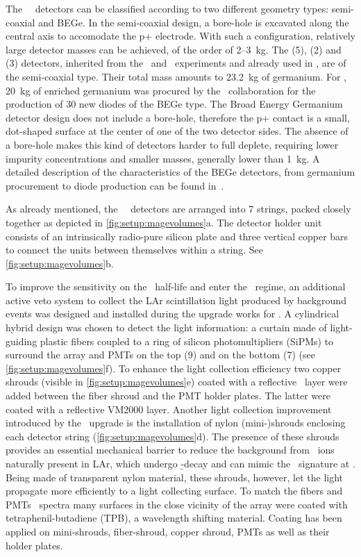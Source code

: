 The \gerda\ \phasetwo\ detectors can be classified according to two different geometry
types: semi-coaxial and BEGe. In the semi-coaxial design, a bore-hole is excavated along
the central axis to accomodate the p+ electrode. With such a configuration, relatively
large detector masses can be achieved, of the order of 2--3~kg. The \ANG{} (5), \RG{} (2)
and \GTF{} (3) detectors, inherited from the \hdm\ and \igex\ experiments and already used
in \phaseone, are of the semi-coaxial type. Their total mass amounts to 23.2~kg of
germanium.  For \phasetwo, 20~kg of enriched germanium was procured by the \gerda\
collaboration for the production of 30 new diodes of the BEGe type. The Broad Energy
Germanium detector design does not include a bore-hole, therefore the p+ contact is a
small, dot-shaped surface at the center of one of the two detector sides. The absence of a
bore-hole makes this kind of detectors harder to full deplete, requiring lower impurity
concentrations and smaller masses, generally lower than 1~kg. A detailed description of
the characteristics of the BEGe detectors, from germanium procurement to diode production
can be found in~\cite{Agostini2015e, Agostini2018a, Agostini2019}.

As already mentioned, the \gerda\ \phasetwo\ detectors are arranged into 7 strings, packed
closely together as depicted in \cref{fig:setup:magevolumes}a. The detector holder unit
consists of an intrinsically radio-pure silicon plate and three vertical copper bars to
connect the units between themselves within a string. See \cref{fig:setup:magevolumes}b.

To improve the sensitivity on the \onbb\ half-life and enter the \bkgfree\ regime, an
additional active veto system to collect the LAr scintillation light produced by
background events was designed and installed during the upgrade works for \phasetwo. A
cylindrical hybrid design was chosen to detect the light information: a curtain made of
light-guiding plastic fibers coupled to a ring of silicon photomultipliers (SiPMs) to
surround the array and PMTs on the top (9) and on the bottom (7) (see
\cref{fig:setup:magevolumes}f). To enhance the light collection efficiency two copper
shrouds (visible in \cref{fig:setup:magevolumes}e) coated with a reflective \tetratex\
layer were added between the fiber shroud and the PMT holder plates. The latter were
coated with a reflective VM2000 layer. Another light collection improvement introduced by
the \phasetwo\ upgrade is the installation of nylon (mini-)shrouds enclosing each detector
string (\cref{fig:setup:magevolumes}d). The presence of these shrouds provides an
essential mechanical barrier to reduce the background from \kvz\ ions naturally present in
LAr, which undergo \b-decay and can mimic the \onbb\ signature at \qbb. Being made of
transparent nylon material, these shrouds, however, let the light propagate more
efficiently to a light collecting surface. To match the fibers and PMTs \fillme\ spectra
many surfaces in the close vicinity of the array were coated with tetraphenil-butadiene
(TPB), a wavelength shifting material. Coating has been applied on mini-shrouds,
fiber-shroud, copper shroud, PMTs as well as their holder plates.

